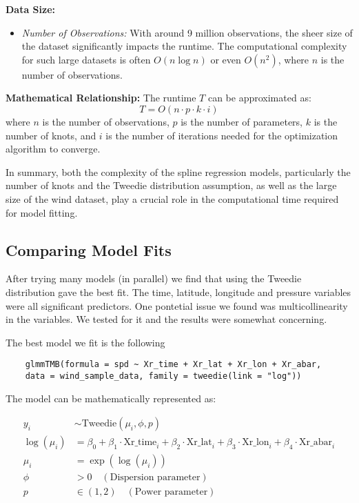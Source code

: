 \textbf{Data Size:}
\begin{itemize}
    \item \textit{Number of Observations:} With around 9 million observations, the sheer size of the dataset significantly impacts the runtime. The computational complexity for such large datasets is often \(O(n \log n)\) or even \(O(n^2)\), where \(n\) is the number of observations.
\end{itemize}

\textbf{Mathematical Relationship:}
The runtime \(T\) can be approximated as:
\[
T = O(n \cdot p \cdot k \cdot i)
\]
where \(n\) is the number of observations, \(p\) is the number of parameters, \(k\) is the number of knots, and \(i\) is the number of iterations needed for the optimization algorithm to converge.
\newline

In summary, both the complexity of the spline regression models, particularly the number of knots and the Tweedie distribution assumption, as well as the large size of the wind dataset, play a crucial role in the computational time required for model fitting. 

\subsection{Comparing Model Fits}
After trying many models (in parallel) we find that using the Tweedie distribution gave the best fit. The time, latitude, longitude and pressure variables were all significant predictors. One pontetial issue we found was multicollinearity in the variables. We tested for it and the results were somewhat concerning. 

The best model we fit is the following 

\begin{verbatim}
    glmmTMB(formula = spd ~ Xr_time + Xr_lat + Xr_lon + Xr_abar, 
    data = wind_sample_data, family = tweedie(link = "log"))
\end{verbatim}

The model can be mathematically represented as:

\[
\begin{aligned}
y_i &\sim \text{Tweedie}(\mu_i, \phi, p) \\
\log(\mu_i) &= \beta_0 + \beta_1 \cdot \text{Xr\_time}_i + \beta_2 \cdot \text{Xr\_lat}_i + \beta_3 \cdot \text{Xr\_lon}_i + \beta_4 \cdot \text{Xr\_abar}_i \\
\mu_i &= \exp(\log(\mu_i)) \\
\phi &> 0 \quad (\text{Dispersion parameter}) \\
p &\in (1, 2) \quad (\text{Power parameter})
\end{aligned}
\]

